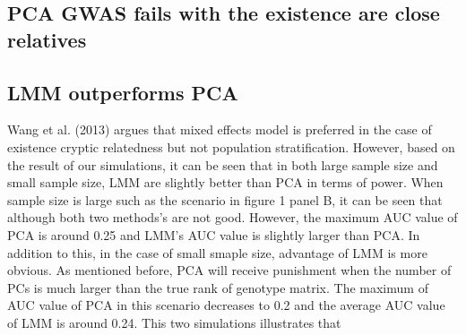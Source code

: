 \documentclass[12pt]{article}
\begin{document}
\subsection{PCA GWAS fails with the existence are close relatives }

\subsection{LMM outperforms PCA }
Wang et al. (2013) argues that mixed effects model is preferred in the case of existence cryptic relatedness but not population stratification. However, based on the result of our simulations, it can be seen that in both large sample size and small sample size, LMM are slightly better than PCA in terms of power. When sample size is large such as the scenario in figure 1 panel B, it can be seen that although both two methods's are not good. However, the maximum AUC value of PCA is around 0.25 and LMM's AUC value is slightly larger than PCA. In addition to this, in the case of small smaple size, advantage of LMM is more obvious. As mentioned before, PCA will receive punishment when the number of PCs is much larger than the true rank of genotype matrix. The maximum of AUC value of PCA in this scenario decreases to 0.2 and the average AUC value of LMM is around 0.24. This two simulations illustrates that 
\end{document}
